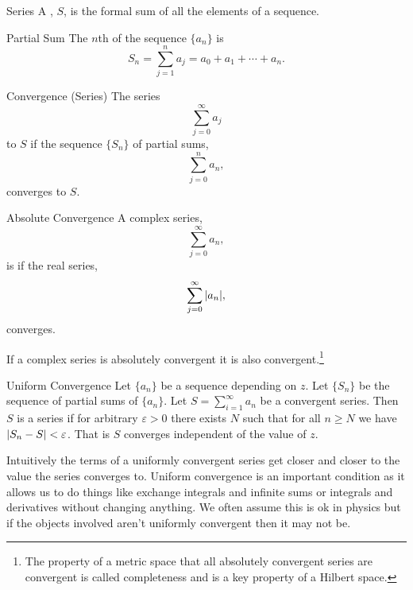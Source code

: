 \documentclass{article}
\begin{document}
    \begin{definition}{Series}{}
        A , \(S\), is the formal sum of all the elements of a sequence.
    \end{definition}
    \begin{definition}{Partial Sum}{}
        The \(n\)th  of the sequence \(\{a_n\}\) is
        \[S_n = \sum_{j=1}^{n} a_j = a_0 + a_1 + \dotsb + a_n.\]
    \end{definition}
    \begin{definition}{Convergence (Series)}
        The series
        \[\sum_{j=0}^{\infty} a_j\]
         to \(S\) if the sequence \(\{S_n\}\) of partial sums,
        \[\sum_{j=0}^{n} a_n,\]
        converges to \(S\).
    \end{definition}
    \begin{definition}{Absolute Convergence}
        A complex series,
        \[\sum_{j=0}^{\infty} a_n,\]
        is  if the real series,
        \[\sum_{j=0}^{\infty} \abs{a_n},\]
        converges.
    \end{definition}
    If a complex series is absolutely convergent it is also convergent.\footnote{The property of a metric space that all absolutely convergent series are convergent is called completeness and is a key property of a Hilbert space.}
    \begin{definition}{Uniform Convergence}{}
        Let \(\{a_n\}\) be a sequence depending on \(z\).
        Let \(\{S_n\}\) be the sequence of partial sums of \(\{a_n\}\).
        Let \(S = \sum_{i=1}^{\infty} a_n\) be a convergent series.
        Then \(S\) is a  series if for arbitrary \(\varepsilon > 0\) there exists \(N\) such that for all \(n \ge N\) we have \(\abs{S_n - S} < \varepsilon\).
        That is \(S\) converges independent of the value of \(z\).
    \end{definition}
    Intuitively the terms of a uniformly convergent series get closer and closer to the value the series converges to.
    Uniform convergence is an important condition as it allows us to do things like exchange integrals and infinite sums or integrals and derivatives without changing anything.
    We often assume this is ok in physics but if the objects involved aren't uniformly convergent then it may not be.
    
\end{document}
